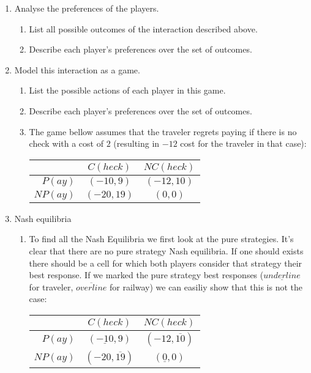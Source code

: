 \documentclass[../main.tex]{subfiles}
\begin{document}
\begin{solution}
\begin{enumerate}
	\item Analyse the preferences of the players.
	\begin{enumerate}
		\item List all possible outcomes of the interaction described above.
		\item Describe each player’s preferences over the set of outcomes.
	\end{enumerate}
	\item Model this interaction as a game.
	\begin{enumerate}
		\item List the possible actions of each player in this game.
		\item Describe each player’s preferences over the set of outcomes.
		\item The game bellow assumes that the traveler regrets paying if there is no check with a cost of $2$ (resulting in $-12$ cost for the traveler in that case):
			\begin{center}
				\begin{tabular}{|r|c|c|}
					\hline
					& $C(heck)$ & $NC(heck)$ \\
					\hline
					$P(ay)$ & $(-10,9)$ & $(-12,10)$ \\
					\hline
					$NP(ay)$ & $(-20,19)$ & $(0,0)$ \\
					\hline
				\end{tabular}
			\end{center}
	\end{enumerate}
	
	\item Nash equilibria
	\begin{enumerate}
		\item To find all the Nash Equilibria we first look at the pure strategies.
			It's clear that there are no pure strategy Nash equilibria. If one should exists there should be a cell for which both players consider that strategy their best response. If we marked the pure strategy best responses ($\underline{underline}$ for traveler, $\overline{overline}$ for railway) we can easiliy show that this is not the case:\\
		 \setlength\extrarowheight{1pt}
		 \begin{center}
			 \begin{tabular}{|r|c|c|}
				 \hline
				 & $C(heck)$ & $NC(heck)$ \\
				 \hline
				 $P(ay)$ & $(\underline{-10},9)$ & $(-12,\overline{10})$ \\ 
				 \hline
				 $NP(ay)$ & $(-20,\overline{19})$ & $(\underline{0},0)$ \\ 
				 \hline
			 \end{tabular}
		 \end{center}


\end{enumerate}
\end{enumerate}
\end{solution}
\end{document}
